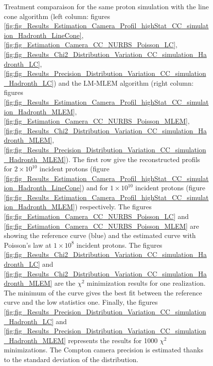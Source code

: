 \begin{figure} [!h]
\caption{Treatment comparaison for the same proton simulation with the line cone algorithm (left column: figures \ref{fig:fig_Results_Estimation_Camera_Profil_highStat_CC_simulation_Hadronth_LineCone}, \ref{fig:fig_Estimation_Camera_CC_NURBS_Poisson_LC}, \ref{fig:fig_Results_Chi2_Distribution_Variation_CC_simulation_Hadronth_LC}, \ref{fig:fig_Results_Precision_Distribution_Variation_CC_simulation_Hadronth_LC}) and the LM-MLEM algorithm (right column: figures \ref{fig:fig_Results_Estimation_Camera_Profil_highStat_CC_simulation_Hadronth_MLEM}, \ref{fig:fig_Estimation_Camera_CC_NURBS_Poisson_MLEM}, \ref{fig:fig_Results_Chi2_Distribution_Variation_CC_simulation_Hadronth_MLEM}, \ref{fig:fig_Results_Precision_Distribution_Variation_CC_simulation_Hadronth_MLEM}). The first row give the reconstructed profils for $2\times10^{10}$ incident protons (figure \ref{fig:fig_Results_Estimation_Camera_Profil_highStat_CC_simulation_Hadronth_LineCone}) and for $1\times10^{10}$ incident protons (figure \ref{fig:fig_Results_Estimation_Camera_Profil_highStat_CC_simulation_Hadronth_MLEM}) respectively. The figures \ref{fig:fig_Estimation_Camera_CC_NURBS_Poisson_LC} and \ref{fig:fig_Estimation_Camera_CC_NURBS_Poisson_MLEM} are showing the reference curve (blue) and the estimated curve with Poisson's law at $1\times10^8$ incident protons. The figures \ref{fig:fig_Results_Chi2_Distribution_Variation_CC_simulation_Hadronth_LC} and \ref{fig:fig_Results_Chi2_Distribution_Variation_CC_simulation_Hadronth_MLEM} are the $\chi^2$ minimization results for one realization. The minimum of the curve gives the best fit between the reference curve and the low statistics one. Finally, the figures  \ref{fig:fig_Results_Precision_Distribution_Variation_CC_simulation_Hadronth_LC} and \ref{fig:fig_Results_Precision_Distribution_Variation_CC_simulation_Hadronth_MLEM} represents the results for 1000 $\chi^2$ minimizations. The Compton camera precision is estimated thanks to the standard deviation of the distribution. }
\end{figure}

